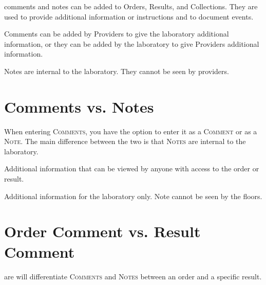 \glspl{comment} and \glspl{note} can be added to Orders, Results, and Collections. They are used to provide additional information or instructions and to document events.

Comments can be added by Providers to give the laboratory additional information, or they can be added by the laboratory to give Providers additional information.

Notes are internal to the laboratory. They cannot be seen by providers.

\section{Comments vs. Notes}
When entering \textsc{Comments}, you have the option to enter it as a \textsc{Comment} or as a \textsc{Note}. The main difference between the two is that \textsc{Notes} are internal to the laboratory.

\begin{description}
     Additional information that can be viewed by anyone with access to the order or result.

     Additional information for the laboratory only. Note cannot be seen by the floors.
\end{description}


\clearpage
\section{Order Comment vs. Result Comment}
\gls{are} will differentiate \textsc{Comments} and \textsc{Notes} between an order and a specific result.\\

